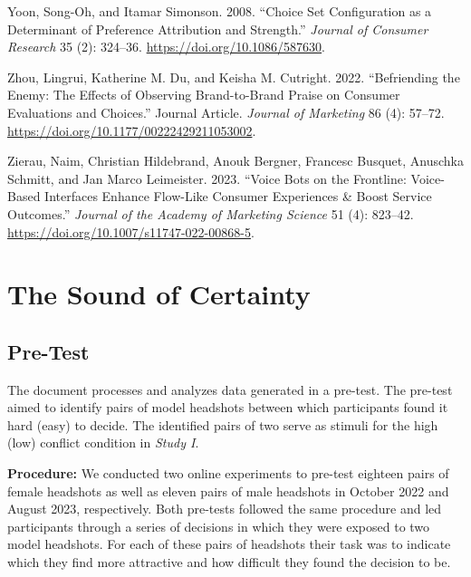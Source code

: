 \documentclass[
  a4paper,
]{scrreprt}
\newlength{\cslhangindent}
\newlength{\cslentryspacingunit} %
\newenvironment{CSLReferences}[2] %
 {%
  \setlength{\parindent}{0pt}
  \ifodd #1
  \let\oldpar\par
  \def\par{\hangindent=\cslhangindent\oldpar}
  \fi
  \setlength{\parskip}{#2\cslentryspacingunit}
 }%
 {}
\begin{document}
\begin{CSLReferences}{1}{0}
\leavevmode{}%
Yoon, Song-Oh, and Itamar Simonson. 2008. {``{Choice Set Configuration
as a Determinant of Preference Attribution and Strength}.''}
\emph{Journal of Consumer Research} 35 (2): 324--36.
\url{https://doi.org/10.1086/587630}.

\leavevmode{}%
Zhou, Lingrui, Katherine M. Du, and Keisha M. Cutright. 2022.
{``Befriending the Enemy: The Effects of Observing Brand-to-Brand Praise
on Consumer Evaluations and Choices.''} Journal Article. \emph{Journal
of Marketing} 86 (4): 57--72.
\url{https://doi.org/10.1177/00222429211053002}.

\leavevmode{}%
Zierau, Naim, Christian Hildebrand, Anouk Bergner, Francesc Busquet,
Anuschka Schmitt, and Jan Marco Leimeister. 2023. {``Voice Bots on the
Frontline: Voice-Based Interfaces Enhance Flow-Like Consumer Experiences
\& Boost Service Outcomes.''} \emph{Journal of the Academy of Marketing
Science} 51 (4): 823--42.
\url{https://doi.org/10.1007/s11747-022-00868-5}.

\end{CSLReferences}

\endgroup

\cleardoublepage
{}
{}
\appendix

\hypertarget{the-sound-of-certainty}{%
\chapter{The Sound of Certainty}\label{the-sound-of-certainty}}

\hypertarget{sec-sound-pre-test}{%
\section{Pre-Test}\label{sec-sound-pre-test}}

The document processes and analyzes data generated in a pre-test. The
pre-test aimed to identify pairs of model headshots between which
participants found it hard (easy) to decide. The identified pairs of two
serve as stimuli for the high (low) conflict condition in \emph{Study
I}.

\textbf{Procedure:} We conducted two online experiments to pre-test
eighteen pairs of female headshots as well as eleven pairs of male
headshots in October 2022 and August 2023, respectively. Both pre-tests
followed the same procedure and led participants through a series of
decisions in which they were exposed to two model headshots. For each of
these pairs of headshots their task was to indicate which they find more
attractive and how difficult they found the decision to be.
\end{document}
